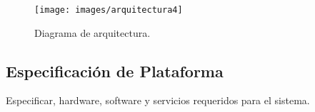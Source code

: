 	\begin{figure}[htbp!]
		\centering
			\texttt{[image: images/arquitectura4]}
		\caption{Diagrama de arquitectura.}
	\end{figure}


\subsection{Especificación de Plataforma}

Especificar, hardware, software y servicios requeridos para el sistema.

